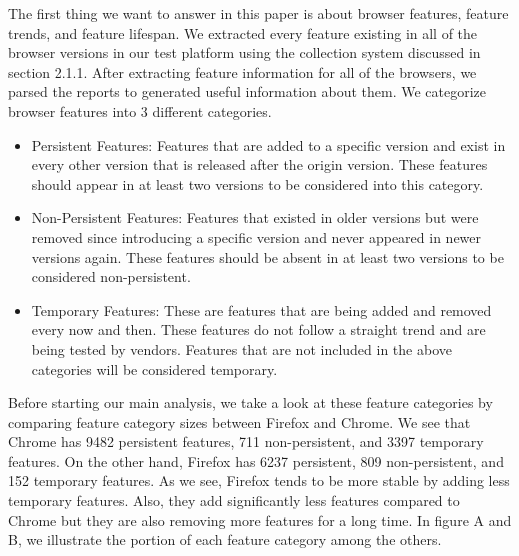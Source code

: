The first thing we want to answer in this paper is about browser features, feature trends, and feature lifespan. We extracted every feature existing in all of the browser versions in our test platform using the collection system discussed in section 2.1.1. After extracting feature information for all of the browsers, we parsed the reports to generated useful information about them. We categorize browser features into 3 different categories.

\begin{itemize}
    \item Persistent Features: Features that are added to a specific version and exist in every other version that is released after the origin version. These features should appear in at least two versions to be considered into this category.
    \item Non-Persistent Features: Features that existed in older versions but were removed since introducing a specific version and never appeared in newer versions again. These features should be absent in at least two versions to be considered non-persistent.
    \item Temporary Features: These are features that are being added and removed every now and then. These features do not follow a straight trend and are being tested by vendors. Features that are not included in the above categories will be considered temporary.
\end{itemize}

Before starting our main analysis, we take a look at these feature categories by comparing feature category sizes between Firefox and Chrome. We see that Chrome has 9482 persistent features, 711 non-persistent, and 3397 temporary features. On the other hand, Firefox has 6237 persistent, 809 non-persistent, and 152 temporary features. As we see, Firefox tends to be more stable by adding less temporary features. Also, they add significantly less features compared to Chrome but they are also removing more features for a long time. In figure A and B, we illustrate the portion of each feature category among the others.

